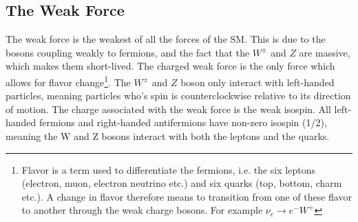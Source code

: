 \subsection{The Weak Force}
The weak force is the weakest of all the forces of the \ac{SM}. This is due to the bosons 
coupling weakly to fermions, and the fact that the $W^{\pm}$ and $Z$ are massive, which makes them short-lived. 
The charged weak force is the only force which allows for flavor change\footnote{Flavor is a term used to differentiate the 
fermions, i.e. the six leptons (electron, muon, electron neutrino etc.) and six quarks (top, bottom, charm etc.).
A change in flavor therefore means to transition from one of these flavor to another through the weak 
charge bosons. For example $\nu_e \rightarrow e^{-}W^+$ }. The $W^{\pm}$ and $Z$ boson only interact with left-handed particles, meaning particles 
who's spin is counterclockwise relative to its direction of motion. The charge associated with the weak force is the weak isospin. 
All left-handed fermions and right-handed antifermions have non-zero isospin (1/2), meaning the W and Z bosons interact with 
both the leptons and the quarks.  